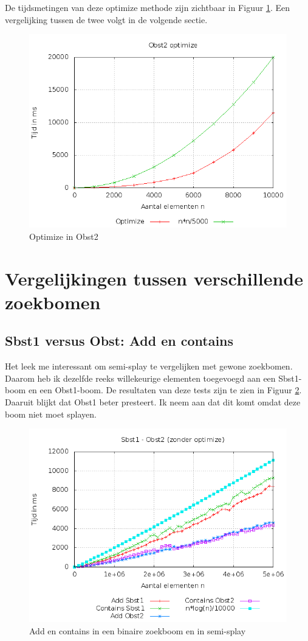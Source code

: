\documentclass[titlepage,a4paper]{article}
\begin{document}
De tijdsmetingen van deze optimize methode zijn zichtbaar in Figuur \ref{obst2_optimize}. Een vergelijking tussen de twee volgt in de volgende sectie.

\begin{figure}[here]
\includegraphics[width=0.9\linewidth]{../Resultaten/obst2_optimize.png}
\caption{Optimize in Obst2}
\label{obst2_optimize}
\end{figure}


\section{Vergelijkingen tussen verschillende zoekbomen}

\subsection{Sbst1 versus Obst: Add en contains}
Het leek me interessant om semi-splay te vergelijken met gewone zoekbomen. Daarom heb ik dezelfde reeks willekeurige elementen toegevoegd aan een Sbst1-boom en een Obst1-boom. De resultaten van deze tests zijn te zien in Figuur \ref{obst_add_contains_vs_sbst1}. Daaruit blijkt dat Obst1 beter presteert. Ik neem aan dat dit komt omdat deze boom niet moet splayen.

\begin{figure}[here]
\includegraphics[width=0.9\linewidth]{../Resultaten/obst2_vs_sbst1.png}
\caption{Add en contains in een binaire zoekboom en in semi-splay}
\label{obst_add_contains_vs_sbst1}
\end{figure}
\end{document}
